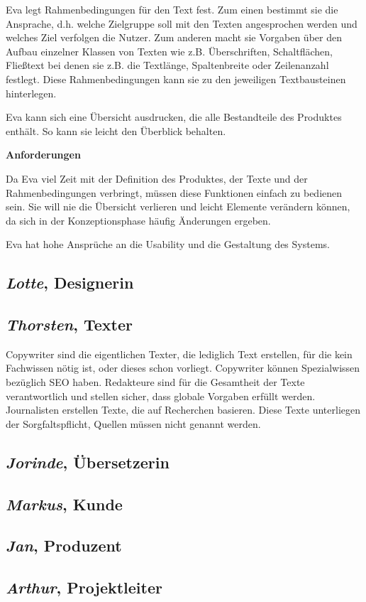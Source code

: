\begin{multicols}{2}
Eva legt Rahmenbedingungen für den Text fest. Zum einen bestimmt sie die Ansprache, d.h. welche Zielgruppe soll mit den Texten angesprochen werden und welches Ziel verfolgen die Nutzer. Zum anderen macht sie Vorgaben über den Aufbau einzelner Klassen von Texten wie z.B. Überschriften, Schaltflächen, Fließtext bei denen sie z.B. die Textlänge, Spaltenbreite oder Zeilenanzahl festlegt. Diese Rahmenbedingungen kann sie zu den jeweiligen Textbausteinen hinterlegen.

Eva kann sich eine Übersicht ausdrucken, die alle Bestandteile des Produktes enthält. So kann sie leicht den Überblick behalten.

\textbf{Anforderungen}

Da Eva viel Zeit mit der Definition des Produktes, der Texte und der Rahmenbedingungen verbringt, müssen diese Funktionen einfach zu bedienen sein. Sie will nie die Übersicht verlieren und leicht Elemente verändern können, da sich in der Konzeptionsphase häufig Änderungen ergeben. 

Eva hat hohe Ansprüche an die Usability und die Gestaltung des Systems.

\end{multicols}

\subsection{\emph{Lotte}, Designerin}\label{p:lotte}

\subsection{\emph{Thorsten}, Texter}\label{p:thorsten}

Copywriter sind die eigentlichen Texter, die lediglich Text erstellen, für die kein Fachwissen nötig ist, oder dieses schon vorliegt. Copywriter können Spezialwissen bezüglich SEO haben. Redakteure sind für die Gesamtheit der Texte verantwortlich und stellen sicher, dass globale Vorgaben erfüllt werden. Journalisten erstellen Texte, die auf Recherchen basieren. Diese Texte unterliegen der Sorgfaltspflicht, Quellen müssen nicht genannt werden. 

\subsection{\emph{Jorinde}, Übersetzerin}\label{p:jorinde}

\subsection{\emph{Markus}, Kunde}\label{p:markus}

\subsection{\emph{Jan}, Produzent}\label{p:jan}

\subsection{\emph{Arthur}, Projektleiter}\label{p:arthur}